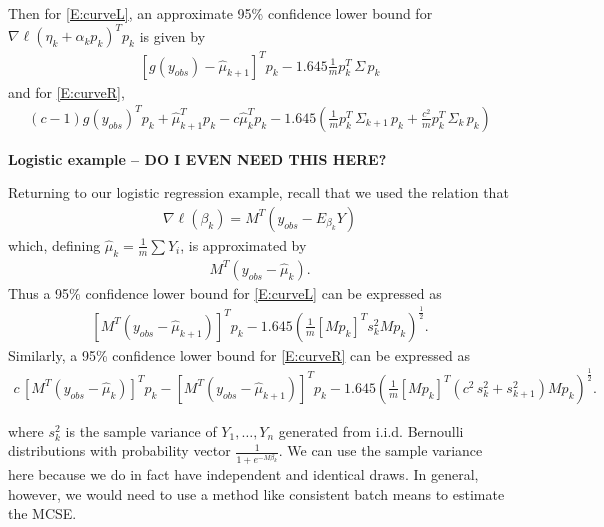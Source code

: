 Then for \eqref{E:curveL}, an approximate 95\% confidence lower bound for $\nabla \ell( \eta_k + \alpha_k p_k)^T p_k$ is given by 
\begin{align*}
	\left [ g(y_{obs}) - \hat{\mu}_{k+1} \right ]^T p_k - 1.645 \frac{1}{m} p_k^T \, \Sigma \, p_k 
\end{align*}
and for \eqref{E:curveR},
\begin{align*}
	(c-1) g(y_{obs})^T p_k + \hat{\mu}_{k+1}^T p_k - c \hat{\mu}_{k}^T p_k - 1.645 \left( \frac{1}{m} p_k^T \, \Sigma_{k+1} \, p_k + \frac{c^2}{m} p_k^T \, \Sigma_{k} \, p_k \right ) 
\end{align*}

\textbf{Logistic example -- DO I EVEN NEED THIS HERE?}

Returning to our logistic regression example, recall that we used the relation that
\begin{align*}
	\nabla \ell (\beta_k) = M^T(y_{obs} - E_{\beta_k}Y) 
\end{align*}
which, defining $\hat{\mu}_k = \frac{1}{m} \sum Y_i$, is approximated by
\begin{align*}
	M^T (y_{obs} - \hat{\mu}_k ).
\end{align*} 
Thus a 95\% confidence lower bound for \eqref{E:curveL} can be expressed as
\begin{align*}
	\left [ M^T (y_{obs} - \hat{\mu}_{k+1} ) \right ]^T p_k - 1.645 \left ( \frac{1}{m} [ M p_k ]^T  s^2_k M p_k \right ) ^{\frac{1}{2}}.
\end{align*}
Similarly, a 95\% confidence lower bound for \eqref{E:curveR} can be expressed as
\begin{align*}
	c \, \left [ M^T (y_{obs} - \hat{\mu}_k ) \right ]^T p_k - \left [ M^T (y_{obs} - \hat{\mu}_{k+1} ) \right ]^T p_k - 1.645 \left ( \frac{1}{m} [ M p_k ]^T  ( c^2 \, s_k^2 + s_{k+1}^2 ) M p_k \right ) ^{\frac{1}{2}}.
\end{align*}

where $s_k^2$ is the sample variance of $Y_1, \ldots, Y_n$ generated from i.i.d. Bernoulli distributions with probability vector $\frac{1}{1 + e^{-M \beta_k}}$.  We can use the sample variance here because we do in fact have independent and identical draws.  In general, however, we would need to use a method like consistent batch means to estimate the MCSE.  

